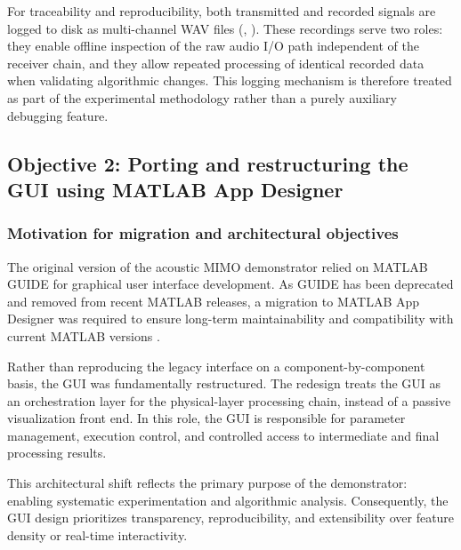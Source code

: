 For traceability and reproducibility, both transmitted and recorded signals are logged to disk as multi-channel WAV files (, ). These recordings serve two roles: they enable offline inspection of the raw audio I/O path independent of the receiver chain, and they allow repeated processing of identical recorded data when validating algorithmic changes. This logging mechanism is therefore treated as part of the experimental methodology rather than a purely auxiliary debugging feature.

\subsection{Objective 2: Porting and restructuring the GUI using MATLAB App Designer}
\label{sec:gui_porting}

\subsubsection{Motivation for migration and architectural objectives}
\label{sec:gui_motivation}

The original version of the acoustic MIMO demonstrator relied on MATLAB GUIDE for graphical user interface development. As GUIDE has been deprecated and removed from recent MATLAB releases, a migration to MATLAB App Designer was required to ensure long-term maintainability and compatibility with current MATLAB versions \cite{mathworks_guide_removed,mathworks_goodbye_guide}.

Rather than reproducing the legacy interface on a component-by-component basis, the GUI was fundamentally restructured. The redesign treats the GUI as an orchestration layer for the physical-layer processing chain, instead of a passive visualization front end. In this role, the GUI is responsible for parameter management, execution control, and controlled access to intermediate and final processing results.

This architectural shift reflects the primary purpose of the demonstrator: enabling systematic experimentation and algorithmic analysis. Consequently, the GUI design prioritizes transparency, reproducibility, and extensibility over feature density or real-time interactivity.

